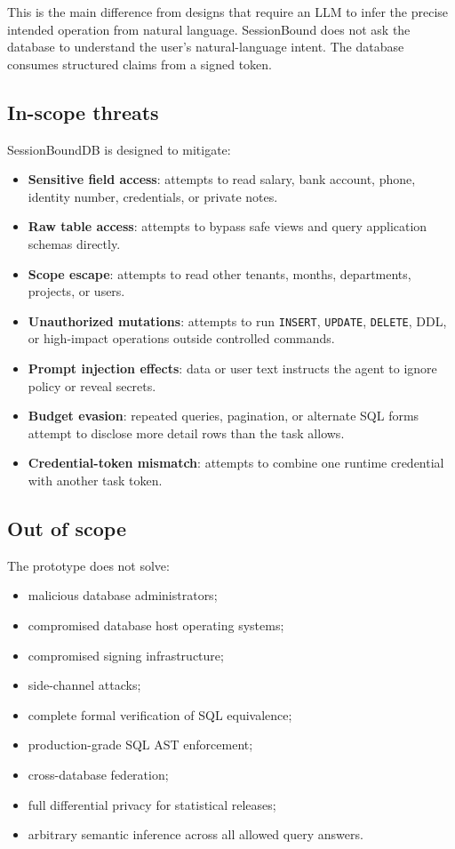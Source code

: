 \documentclass[
]{article}
\providecommand{\tightlist}{%
  \setlength{\itemsep}{0pt}\setlength{\parskip}{0pt}}
\begin{document}
This is the main difference from designs that require an LLM to infer
the precise intended operation from natural language. SessionBound does
not ask the database to understand the user's natural-language intent.
The database consumes structured claims from a signed token.

\hypertarget{in-scope-threats}{%
\subsection{In-scope threats}\label{in-scope-threats}}

SessionBoundDB is designed to mitigate:

\begin{itemize}
\tightlist
\item
  \textbf{Sensitive field access}: attempts to read salary, bank
  account, phone, identity number, credentials, or private notes.
\item
  \textbf{Raw table access}: attempts to bypass safe views and query
  application schemas directly.
\item
  \textbf{Scope escape}: attempts to read other tenants, months,
  departments, projects, or users.
\item
  \textbf{Unauthorized mutations}: attempts to run \texttt{INSERT},
  \texttt{UPDATE}, \texttt{DELETE}, DDL, or high-impact operations
  outside controlled commands.
\item
  \textbf{Prompt injection effects}: data or user text instructs the
  agent to ignore policy or reveal secrets.
\item
  \textbf{Budget evasion}: repeated queries, pagination, or alternate
  SQL forms attempt to disclose more detail rows than the task allows.
\item
  \textbf{Credential-token mismatch}: attempts to combine one runtime
  credential with another task token.
\end{itemize}

\hypertarget{out-of-scope}{%
\subsection{Out of scope}\label{out-of-scope}}

The prototype does not solve:

\begin{itemize}
\tightlist
\item
  malicious database administrators;
\item
  compromised database host operating systems;
\item
  compromised signing infrastructure;
\item
  side-channel attacks;
\item
  complete formal verification of SQL equivalence;
\item
  production-grade SQL AST enforcement;
\item
  cross-database federation;
\item
  full differential privacy for statistical releases;
\item
  arbitrary semantic inference across all allowed query answers.
\end{itemize}
\end{document}
